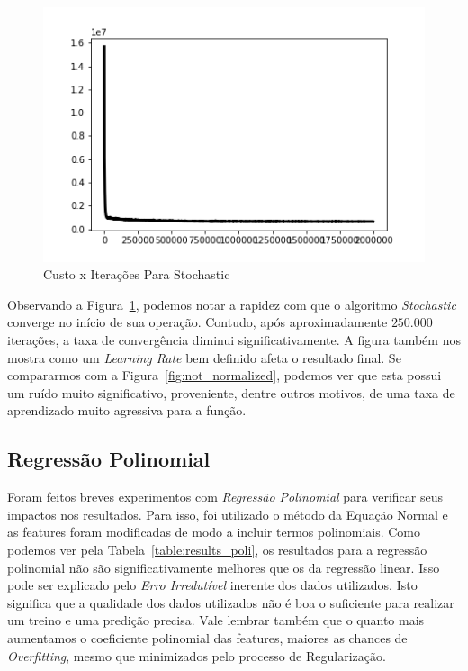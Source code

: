 \documentclass[conference]{IEEEtran}
\begin{document}
\begin{figure}[H]
  \includegraphics[width=\linewidth]{gfx/S_costitr_mitr2000000.png}
  \caption{Custo x Iterações Para Stochastic}
  \label{fig:costs_sto}
\end{figure}

Observando a Figura~\ref{fig:costs_sto}, podemos notar a rapidez com que o algoritmo \textit{Stochastic} converge no início de sua operação. Contudo, após aproximadamente $250.000$ iterações, a taxa de convergência diminui significativamente. A figura também nos mostra como um \textit{Learning Rate} bem definido afeta  o resultado final. Se compararmos com a Figura~\ref{fig:not_normalized}, podemos ver que esta possui um ruído muito significativo, proveniente, dentre outros motivos, de uma taxa de aprendizado muito agressiva para a função.

\subsection{Regressão Polinomial}

Foram feitos breves experimentos com \textit{Regressão Polinomial} para verificar seus impactos nos resultados. Para isso, foi utilizado o método da Equação Normal e as features foram modificadas de modo a incluir termos polinomiais. Como podemos ver pela Tabela~\ref{table:results_poli}, os resultados para a regressão polinomial não são significativamente melhores que os da regressão linear. Isso pode ser explicado pelo \textit{Erro Irredutível} inerente dos dados utilizados. Isto significa que a qualidade dos dados utilizados não é boa o suficiente para realizar um treino e uma predição precisa. Vale lembrar também que o quanto mais aumentamos o coeficiente polinomial das features, maiores as chances de \textit{Overfitting}, mesmo que minimizados pelo processo de Regularização.
\end{document}
